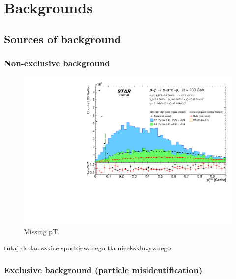 
\chapter{Backgrounds}\label{chap:backgrounds}

\section{Sources of background}
\subsection{Non-exclusive background}\label{sec:nonExclBkgd}

\begin{figure}[ht!]
\centering%
\includegraphics[width=0.65\linewidth,page=1]{graphics/backgrounds/Raw_MissingPtPid.pdf}%
\caption{Missing pT.}\label{fig:missingPtBkgd}%
\end{figure}
tutaj dodac szkice spodziewanego tla nieekskluzywnego

\subsection{Exclusive background (particle misidentification)}\label{sec:exclBkgd}

